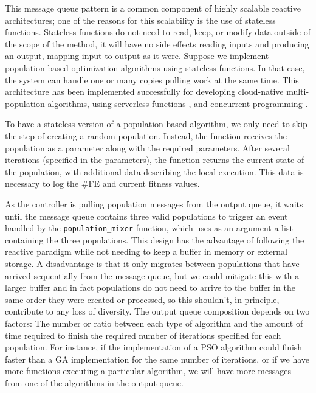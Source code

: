 \documentclass[runningheads]{llncs}
\begin{document}
This message queue pattern is a common component of highly
scalable reactive architectures; one of the reasons for this
scalability is the use of stateless functions. Stateless
functions do not need to read, keep, or modify data outside of the
scope of the method, it will have no side effects reading inputs and
producing an output, mapping input to output as it were. Suppose we
implement population-based optimization algorithms using stateless
functions. In that case, the system can handle one or many copies 
pulling work at the same time. 
This architecture has been implemented successfully for
developing cloud-native multi-population algorithms, using serverless
functions \cite{garcia2018modern}, and concurrent programming
\cite{guervos2019improving}.

To have a stateless version of a population-based algorithm, we only need to
skip the step of creating a random population. Instead, the function receives
the population as a parameter along with the required parameters. After several
iterations (specified in the parameters), the function returns the current state
of the population, with additional data describing the local execution. This
data is necessary to log the \#FE and current fitness values.

As the controller is pulling population messages from the output
queue, it waits until the message queue contains three valid
populations to trigger an event handled by the
\texttt{population\_mixer} function, which uses as an argument a list
containing the three populations. This design has the advantage of following 
the reactive paradigm while not needing to keep a buffer
in memory or external storage. A disadvantage is that it only 
migrates between populations that have arrived sequentially from the message queue,
but we could mitigate this with a larger buffer and in fact
populations do not need to arrive to the buffer in the same order they
were created or processed, so this shouldn't, in principle, contribute
to any loss of diversity. The output queue composition depends on two factors:
The number or ratio between each type of algorithm and
the amount of time required to finish the required
number of iterations specified for each population.
For instance, if the implementation of a PSO algorithm
could finish faster than a GA implementation for the
same number of iterations, or if we have more
functions executing a particular algorithm, we will
have more messages from one of the algorithms in the
output queue.
\end{document}
